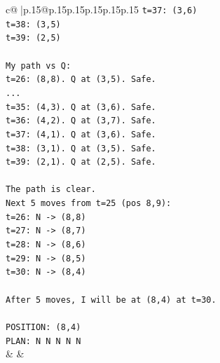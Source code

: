 \documentclass{article}
\begin{document}
{\begin{supertabular}{c@{$\;$}|p{.15\linewidth}@{}p{.15\linewidth}p{.15\linewidth}p{.15\linewidth}p{.15\linewidth}p{.15\linewidth}}
{{{\texttt{t=37: (3,6)} \\
\texttt{t=38: (3,5)} \\
\texttt{t=39: (2,5)} \\
\\ 
\texttt{My path vs Q:} \\
\texttt{t=26: (8,8). Q at (3,5). Safe.} \\
\texttt{...} \\
\texttt{t=35: (4,3). Q at (3,6). Safe.} \\
\texttt{t=36: (4,2). Q at (3,7). Safe.} \\
\texttt{t=37: (4,1). Q at (3,6). Safe.} \\
\texttt{t=38: (3,1). Q at (3,5). Safe.} \\
\texttt{t=39: (2,1). Q at (2,5). Safe.} \\
\\ 
\texttt{The path is clear.} \\
\texttt{Next 5 moves from t=25 (pos 8,9):} \\
\texttt{t=26: N {-}> (8,8)} \\
\texttt{t=27: N {-}> (8,7)} \\
\texttt{t=28: N {-}> (8,6)} \\
\texttt{t=29: N {-}> (8,5)} \\
\texttt{t=30: N {-}> (8,4)} \\
\\ 
\texttt{After 5 moves, I will be at (8,4) at t=30.} \\
\\ 
\texttt{POSITION: (8,4)} \\
\texttt{PLAN: N N N N N} \\
            }
        }
    }
    & & \\ \\


\end{supertabular}}
\end{document}

